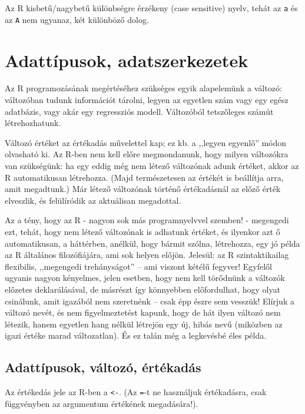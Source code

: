 \documentclass[
]{book}
\begin{document}
Az R kisbetű/nagybetű különbségre érzékeny (case sensitive) nyelv, tehát az \texttt{a} és az \texttt{A} nem ugyanaz, két különböző dolog.

\hypertarget{adattuxedpusok-adatszerkezetek}{%
\chapter{Adattípusok, adatszerkezetek}\label{adattuxedpusok-adatszerkezetek}}

Az R programozásának megértéséhez szükséges egyik alapelemünk a változó: változóban tudunk információt tárolni, legyen az egyetlen szám vagy egy egész adatbázis, vagy akár egy regressziós modell. Változóból tetszőleges számút létrehozhatunk.

Változó értéket az értékadás művelettel kap; ez kb. a ,,legyen egyenlő'' módon olvasható ki. Az R-ben nem kell előre megmondanunk, hogy milyen változókra van szükségünk: ha egy eddig még nem létező változónak adunk értéket, akkor az R automatikusan létrehozza. (Majd természetesen az értékét is beállítja arra, amit megadtunk.) Már létező változónak történő értékadásnál az előző érték elveszlik, és felülíródik az aktuálisan megadottal.

Az a tény, hogy az R - nagyon sok más programnyelvvel szemben! - megengedi ezt, tehát, hogy nem létező változónak is adhatunk értéket, és ilyenkor azt ő automatikusan, a háttérben, anélkül, hogy bármit szólna, létrehozza, egy jó példa az R általános filozófiájára, ami sok helyen előjön. Jelesül: az R szintaktikailag flexibilis, ,,megengedi trehányságot'' -- ami viszont kétélű fegyver! Egyfelől ugyanis nagyon kényelmes, jelen esetben, hogy nem kell törődnünk a változók előzetes deklarálásával, de másrészt így könnyebben előfordulhat, hogy olyat csinálunk, amit igazából nem szeretnénk -- csak épp észre sem vesszük! Elírjuk a változó nevét, és nem figyelmeztetést kapunk, hogy de hát ilyen változó nem létezik, hanem egyetlen hang nélkül létrejön egy új, hibás nevű (miközben az igazi értéke marad változatlan). És ez talán még a legkevésbé éles példa.

\hypertarget{adattuxedpusok-vuxe1ltozuxf3-uxe9rtuxe9kaduxe1s}{%
\section{Adattípusok, változó, értékadás}\label{adattuxedpusok-vuxe1ltozuxf3-uxe9rtuxe9kaduxe1s}}

Az értékedás jele az R-ben a \texttt{\textless{}-}. (Az \texttt{=}-t ne használjuk értékadásra, csak függvényben az argumentum értékének megadására!).
\end{document}
